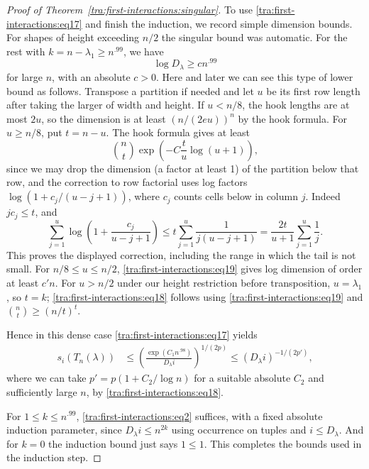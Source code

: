 \begin{proof}[Proof of Theorem~\ref{tra:first-interactions:singular}]
\label{tra:first-interactions:dimension-and-all-index-closure}
To use \eqref{tra:first-interactions:eq17} and finish the induction, we record simple dimension bounds. For shapes of height exceeding \(n/2\) the singular bound was automatic. For the rest with \(k=n-\lambda_1\ge n^{.99}\), we have
\begin{equation}
                              \log D_\lambda\ge c n^{.99}\label{tra:first-interactions:eq18}
\end{equation}
for large \(n\), with an absolute \(c>0\). Here and later we can see this type of lower bound as follows. Transpose a partition if needed and let \(u\) be its first row length after taking the larger of width and height. If \(u<n/8\), the hook lengths are at most \(2u\), so the dimension is at least \((n/(2eu))^n\) by the hook formula. For \(u\ge n/8\), put \(t=n-u\). The hook formula gives at least
\begin{equation}
                 \binom{n}{t}\exp\left(-C\frac{t}{u}\log(u+1)\right),\label{tra:first-interactions:eq19}
\end{equation}
since we may drop the dimension (a factor at least 1) of the partition below that row, and the correction to row factorial uses log factors
\(\log(1+c_j/(u-j+1))\), where \(c_j\) counts cells below in column \(j\). Indeed $jc_j\le t$, and
\[
 \sum_{j=1}^{u}\log\left(1+\frac{c_j}{u-j+1}\right)
 \le t\sum_{j=1}^{u}\frac{1}{j(u-j+1)}
 =\frac{2t}{u+1}\sum_{j=1}^{u}\frac1j.
\]
This proves the displayed correction, including the range in which
the tail is not small. For \(n/8\le u\le n/2\), \eqref{tra:first-interactions:eq19} gives log dimension of order at least \(c' n\). For \(u>n/2\) under our height restriction before transposition, \(u=\lambda_1\), so \(t=k\); \eqref{tra:first-interactions:eq18} follows using \eqref{tra:first-interactions:eq19} and \(\binom{n}{t}\ge (n/t)^t\).

Hence in this dense case \eqref{tra:first-interactions:eq17} yields
\[
 \begin{aligned}
                s_i(T_n(\lambda))
                    &\le \left(\frac{\exp(C_1 n^{.98})}{D_\lambda i}\right)^{1/(2p)}
                     \le (D_\lambda i)^{-1/(2p')},
 \end{aligned}
\]
where we can take \(p'=p(1+C_2/\log n)\) for a suitable absolute \(C_2\) and sufficiently large \(n\), by \eqref{tra:first-interactions:eq18}.

For \(1\le k\le n^{.99}\), \eqref{tra:first-interactions:eq2} suffices, with a fixed absolute induction parameter, since \(D_\lambda i\le n^{2k}\) using occurrence on tuples and \(i\le D_\lambda\). And for \(k=0\) the induction bound just says \(1\le 1\). This completes the bounds used in the induction step.


\end{proof}
